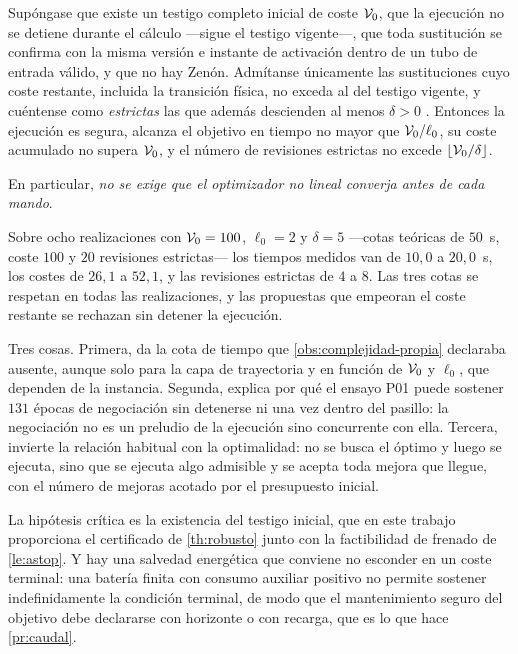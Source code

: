 \begin{teorema}
\label{th:testigo}
Supóngase que existe un testigo completo inicial de coste $\mathcal{V}_0$, que la
ejecución no se detiene durante el cálculo —sigue el testigo vigente—, que toda
sustitución se confirma con la misma versión e instante de activación dentro de
un tubo de entrada válido, y que no hay Zenón. Admítanse únicamente las
sustituciones cuyo coste restante, incluida la transición física, no exceda al
del testigo vigente, y cuéntense como \emph{estrictas} las que además descienden
al menos $\delta>0$ \cite{mayorga2026m1}. Entonces la ejecución es segura, alcanza el objetivo en
tiempo no mayor que $\mathcal{V}_0/\ell_0$, su coste acumulado no supera $\mathcal{V}_0$, y
el número de revisiones estrictas no excede $\lfloor\mathcal{V}_0/\delta\rfloor$.

En particular, \emph{no se exige que el optimizador no lineal converja antes de
cada mando}.
\end{teorema}

\begin{observacion}
\label{obs:testigo-num}
Sobre ocho realizaciones con $\mathcal{V}_0=100$, $\ell_0=2$ y $\delta=5$ —cotas
teóricas de $50$~s, coste $100$ y $20$ revisiones estrictas— los tiempos medidos
van de $10{,}0$ a $20{,}0$~s, los costes de $26{,}1$ a $52{,}1$, y las revisiones
estrictas de $4$ a $8$. Las tres cotas se respetan en todas las realizaciones, y
las propuestas que empeoran el coste restante se rechazan sin detener la
ejecución.
\end{observacion}

\begin{observacion}
\label{obs:testigo-alcance}
Tres cosas. Primera, da la cota de tiempo que \cref{obs:complejidad-propia}
declaraba ausente, aunque solo para la capa de trayectoria y en función de
$\mathcal{V}_0$ y $\ell_0$, que dependen de la instancia. Segunda, explica por qué el
ensayo P01 puede sostener $131$ épocas de negociación sin detenerse ni una vez
dentro del pasillo: la negociación no es un preludio de la ejecución sino
concurrente con ella. Tercera, invierte la relación habitual con la
optimalidad: no se busca el óptimo y luego se ejecuta, sino que se ejecuta algo
admisible y se acepta toda mejora que llegue, con el número de mejoras acotado
por el presupuesto inicial.

La hipótesis crítica es la existencia del testigo inicial, que en este trabajo
proporciona el certificado de \cref{th:robusto} junto con la factibilidad de
frenado de \cref{le:astop}. Y hay una salvedad energética que conviene no
esconder en un coste terminal: una batería finita con consumo auxiliar positivo
no permite sostener indefinidamente la condición terminal, de modo que el
mantenimiento seguro del objetivo debe declararse con horizonte o con recarga,
que es lo que hace \cref{pr:caudal}.
\end{observacion}

